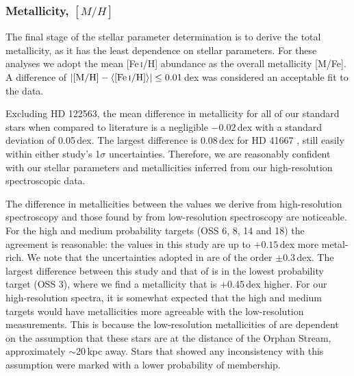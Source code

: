 \documentclass{emulateapj}
\begin{document}





\subsubsection{Metallicity, $[M/H]$}
\label{sec:analysis-metallicity}

The final stage of the stellar parameter determination is to derive the total metallicity, as it has the least dependence on stellar parameters. For these analyses we adopt the mean [Fe\,\textsc{i}/H] abundance as the overall metallicity [M/Fe]. A difference of ${|\textrm{[M/H]} - \langle\textrm{[Fe\,\textsc{i}/H]}\rangle| \leq 0.01}$\,dex was considered an acceptable fit to the data. 

Excluding HD 122563, the mean difference in metallicity for all of our standard stars when compared to literature is a negligible $-$0.02\,dex with a standard deviation of 0.05\,dex. The largest difference is 0.08\,dex for HD 41667 \citep{gratton;et-al_2000}, still easily within either study's 1$\sigma$ uncertainties. Therefore, we are reasonably confident with our stellar parameters and metallicities inferred from our high-resolution spectroscopic data.

The difference in metallicities between the values we derive from high-resolution spectroscopy and those found by \citet{casey;et-al_2013a} from low-resolution spectroscopy are noticeable. For the high and medium probability targets (OSS 6, 8, 14 and 18) the agreement is reasonable: the values in this study are up to $+0.15$\,dex more metal-rich. We note that the uncertainties adopted in \citet{casey;et-al_2013a} are of the order $\pm0.3$\,dex. The largest difference between this study and that of \citet{casey;et-al_2013a} is in the lowest probability target (OSS 3), where we find a metallicity that is $+$0.45\,dex higher. For our high-resolution spectra, it is somewhat expected that the high and medium targets would have metallicities more agreeable with the low-resolution measurements. This is because the low-resolution metallicities of \citet{casey;et-al_2013a} are dependent on the assumption that these stars are at the distance of the Orphan Stream, approximately $\sim$20\,kpc away. Stars that showed any inconsistency with this assumption were marked with a lower probability of membership.
\end{document}

